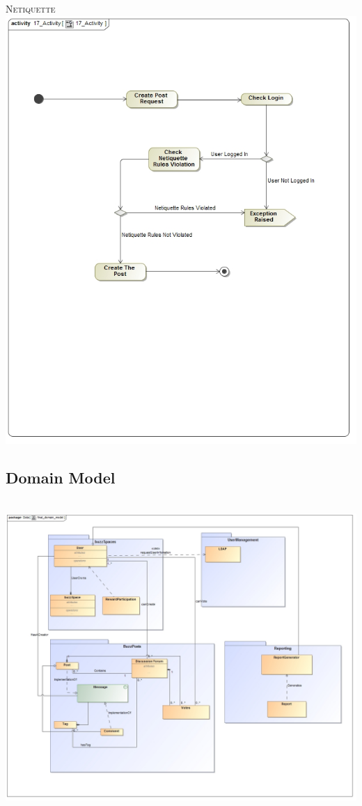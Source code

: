 \documentclass[a4paper,12pt]{report}
\begin{document}
\newpage
\textsc{Netiquette}
\emph{}\\
\includegraphics[width=1\textwidth]{./17_Activity.jpg}\\[0.4cm]

\newpage
\subsection{Domain Model}
\emph{}\\
\includegraphics[width=1\textwidth]{./final_domain_model_a.jpg}\\[0.4cm]
\end{document}
